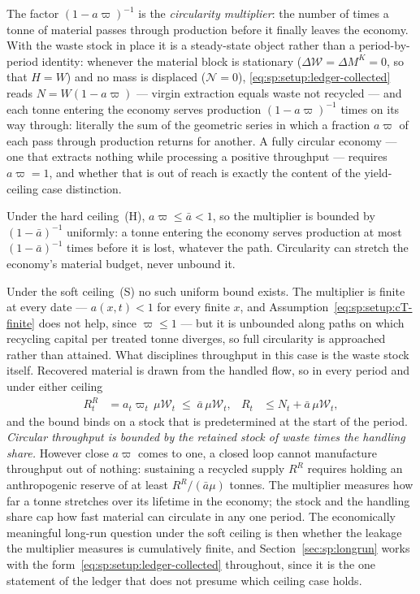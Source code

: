The factor $\left(1-a\varpi\right)^{-1}$ is the \emph{circularity multiplier}: the number of times a tonne of material passes through production before it finally leaves the economy. With the waste stock in place it is a steady-state object rather than a period-by-period identity: whenever the material block is stationary ($\Delta\mathcal W=\Delta M^K=0$, so that $H=W$) and no mass is displaced ($\mathcal N=0$), \eqref{eq:sp:setup:ledger-collected} reads $N=W\left(1-a\varpi\right)$ --- virgin extraction equals waste not recycled --- and each tonne entering the economy serves production $\left(1-a\varpi\right)^{-1}$ times on its way through: literally the sum of the geometric series in which a fraction $a\varpi$ of each pass through production returns for another. A fully circular economy --- one that extracts nothing while processing a positive throughput --- requires $a\varpi=1$, and whether that is out of reach is exactly the content of the yield-ceiling case distinction.

Under the hard ceiling~(H), $a\varpi\le\bar a<1$, so the multiplier is bounded by $\left(1-\bar a\right)^{-1}$ uniformly: a tonne entering the economy serves production at most $\left(1-\bar a\right)^{-1}$ times before it is lost, whatever the path. Circularity can stretch the economy's material budget, never unbound it.

Under the soft ceiling~(S) no such uniform bound exists. The multiplier is finite at every date --- $a\left(x,t\right)<1$ for every finite $x$, and Assumption~\eqref{eq:sp:setup:cT-finite} does not help, since $\varpi\le1$ --- but it is unbounded along paths on which recycling capital per treated tonne diverges, so full circularity is approached rather than attained. What disciplines throughput in this case is the waste stock itself. Recovered material is drawn from the handled flow, so in every period and under either ceiling
\begin{align}
R^R_t &= a_t\varpi_t\,\mu\mathcal W_t \;\le\; \bar a\,\mu\mathcal W_t,
&
R_t &\le N_t+\bar a\,\mu\mathcal W_t ,
\label{eq:sp:setup:throughput-cap}
\end{align}
and the bound binds on a stock that is predetermined at the start of the period. \emph{Circular throughput is bounded by the retained stock of waste times the handling share.} However close $a\varpi$ comes to one, a closed loop cannot manufacture throughput out of nothing: sustaining a recycled supply $R^R$ requires holding an anthropogenic reserve of at least $R^R/\left(\bar a\mu\right)$ tonnes. The multiplier measures how far a tonne stretches over its lifetime in the economy; the stock and the handling share cap how fast material can circulate in any one period. The economically meaningful long-run question under the soft ceiling is then whether the leakage the multiplier measures is cumulatively finite, and Section~\ref{sec:sp:longrun} works with the form~\eqref{eq:sp:setup:ledger-collected} throughout, since it is the one statement of the ledger that does not presume which ceiling case holds.



